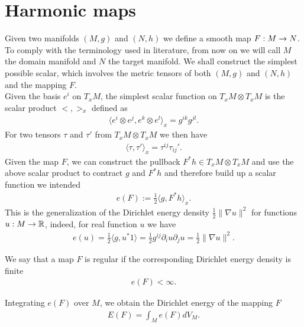 \section{Harmonic maps}
\label{sec:preliminaries}

Given two manifolds $(M,g)$ and $(N,h)$ we define a smooth map $F:M\rightarrow
N$. To comply with the terminology used in literature, from now on we
will call $M$ the domain manifold and $N$ the target manifold. We
shall construct the simplest possible scalar,
which involves the metric tensors of both $(M,g)$ and $(N,h)$ and the mapping $F$.\\
Given the basis $e^i$ on $T_x M$, the simplest scalar function on $T_x
M\otimes T_x M$ is the scalar product $<,>_x$ defined as
\begin{align}
  \label{eq:1}
  \langle e^i\otimes e^j,e^k\otimes e^l\rangle_x=g^{ik}g^{jl}.
\end{align}
For two tensors $\tau$ and $\tau'$ from $T_x M\otimes T_x M$ we then
have
\begin{align}
  \label{eq:2}
  \langle\tau,\tau'\rangle_x=\tau^{ij}\tau_{ij}'.
\end{align}
Given the map $F$, we can construct the pullback $F^*h\in T_x M\otimes
T_x M$ and use the above scalar product to contract $g$ and $F^* h$
and therefore build up a scalar function we intended
\begin{align}
  \label{eq:3}
  e(F):=\frac{1}{2}\langle g,F^*h\rangle_x.
\end{align}
This is the generalization of the Dirichlet energy density
$\frac{1}{2}\lVert\nabla u\rVert^2$ for functions $u:M\rightarrow\mathbb{R}$,
indeed, for real function $u$ we have
\begin{align}
  \label{eq:4}
  e(u)=\frac{1}{2}\langle g,u^*1\rangle=\frac{1}{2}g^{ij}\partial_i u\partial_j u
  =\frac{1}{2}\lVert\nabla u\rVert^2.
\end{align}

\begin{definition}\label{def:regular-map}
  We say that a map $F$ is regular if the corresponding Dirichlet
  energy density is finite
  \begin{align}
    \label{eq:5}
    e(F)<\infty.
  \end{align}
\end{definition}

Integrating $e(F)$ over $M$, we obtain the Dirichlet energy of the
mapping $F$
\begin{align}\label{eq:6}
  E(F)=\int_M e(F)dV_M.
\end{align}

